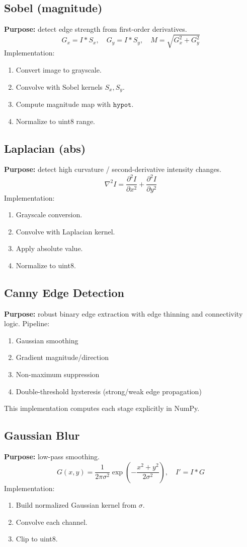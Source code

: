 \documentclass[11pt,a4paper]{article}
\begin{document}
\subsection{Sobel (magnitude)}
\textbf{Purpose:} detect edge strength from first-order derivatives.
\[
G_x = I * S_x,\quad G_y = I * S_y,\quad M = \sqrt{G_x^2 + G_y^2}
\]
Implementation:
\begin{enumerate}[leftmargin=1.2cm]
  \item Convert image to grayscale.
  \item Convolve with Sobel kernels \(S_x,S_y\).
  \item Compute magnitude map with \(\texttt{hypot}\).
  \item Normalize to uint8 range.
\end{enumerate}

\subsection{Laplacian (abs)}
\textbf{Purpose:} detect high curvature / second-derivative intensity changes.
\[
\nabla^2 I = \frac{\partial^2 I}{\partial x^2} + \frac{\partial^2 I}{\partial y^2}
\]
Implementation:
\begin{enumerate}[leftmargin=1.2cm]
  \item Grayscale conversion.
  \item Convolve with Laplacian kernel.
  \item Apply absolute value.
  \item Normalize to uint8.
\end{enumerate}

\subsection{Canny Edge Detection}
\textbf{Purpose:} robust binary edge extraction with edge thinning and connectivity logic.
Pipeline:
\begin{enumerate}[leftmargin=1.2cm]
  \item Gaussian smoothing
  \item Gradient magnitude/direction
  \item Non-maximum suppression
  \item Double-threshold hysteresis (strong/weak edge propagation)
\end{enumerate}
This implementation computes each stage explicitly in NumPy.

\subsection{Gaussian Blur}
\textbf{Purpose:} low-pass smoothing.
\[
G(x,y)=\frac{1}{2\pi\sigma^2}\exp\left(-\frac{x^2+y^2}{2\sigma^2}\right),\quad I' = I * G
\]
Implementation:
\begin{enumerate}[leftmargin=1.2cm]
  \item Build normalized Gaussian kernel from \(\sigma\).
  \item Convolve each channel.
  \item Clip to uint8.
\end{enumerate}
\end{document}
